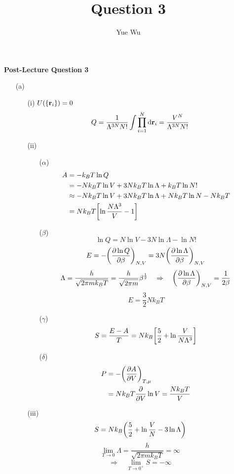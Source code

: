 \documentclass{article}
\title{Question 3}
\author{Yue Wu}
\begin{document}
    \begin{center}
        \LARGE\textbf{Post-Lecture Question 3}
    \end{center}

    \begin{enumerate}
        \item[(a)]
        \begin{enumerate}
            \item[(i)] $U(\{\vb{r}_i\})=0$
            $$Q=\frac{1}{\Lambda^{3N}N!}\int\prod_{i=1}^{N}\dd{\vb{r}_i}=\frac{V^N}{\Lambda^{3N}N!}$$
            
            \item[(ii)]
            \begin{enumerate}
                \item[($\alpha$)]
                \begin{align*}
                    A&=-k_BT\ln Q\\
                    &=-Nk_BT\ln V+3Nk_B T\ln\Lambda+k_B T\ln N!\\
                    &\approx -Nk_BT\ln V+3Nk_BT\ln\Lambda+Nk_BT\ln N-Nk_BT\\
                    &=Nk_BT\qty[\ln\frac{N\Lambda^3}{V}-1]
                \end{align*}
                \item[($\beta$)]
                $$\ln Q=N\ln V-3N\ln\Lambda-\ln N!$$
                $$E=-\qty(\pdv{\ln Q}{\beta})_{N,V}=3N\qty(\pdv{\ln\Lambda}{\beta})_{N,V}$$
                $$\Lambda=\frac{h}{\sqrt{2\pi mk_B T}}=\frac{h}{\sqrt{2\pi m}}\beta^{\frac{1}{2}}\quad\Rightarrow\quad\qty(\pdv{\ln\Lambda}{\beta})_{N,V}=\frac{1}{2\beta}$$
                $$E=\frac{3}{2}Nk_B T$$
                \item[($\gamma$)]
                $$S=\frac{E-A}{T}=Nk_B\qty[\frac{5}{2}+\ln\frac{V}{N\Lambda^3}]$$
                \item[($\delta$)] 
                \begin{align*}
                    P&=-\qty(\pdv{A}{V})_{T,\mu}\\
                    &=Nk_BT\pdv{V}\ln V=\frac{Nk_BT}{V}
                \end{align*}
            \end{enumerate}
            \item[(iii)]
            $$S=Nk_B\qty(\frac{5}{2}+\ln\frac{V}{N}-3\ln\Lambda)$$
            $$\lim_{T\to 0}\Lambda=\frac{h}{\sqrt{2\pi mk_BT}}=\infty$$
            $$\Rightarrow\quad\lim_{T\to 0^+}S=-\infty$$

\end{enumerate}
\end{enumerate}
\end{document}
